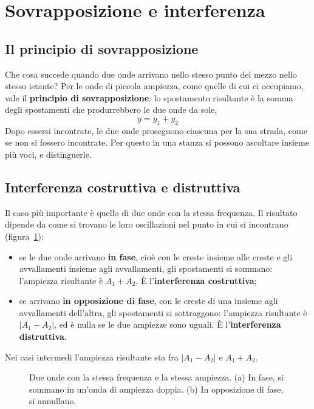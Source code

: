 \section{Sovrapposizione e interferenza}
\label{sec:ud4-interferenza}

\subsection{Il principio di sovrapposizione}

Che cosa succede quando due onde arrivano nello stesso punto del mezzo nello stesso istante? Per le onde di piccola ampiezza, come quelle di cui ci occupiamo, vale il \textbf{principio di sovrapposizione}: lo spostamento risultante è la somma degli spostamenti che produrrebbero le due onde da sole,
\[
  y = y_1 + y_2
\]
Dopo essersi incontrate, le due onde proseguono ciascuna per la sua strada, come se non si fossero incontrate. Per questo in una stanza si possono ascoltare insieme più voci, e distinguerle.

\subsection{Interferenza costruttiva e distruttiva}

Il caso più importante è quello di due onde con la stessa frequenza. Il risultato dipende da come si trovano le loro oscillazioni nel punto in cui si incontrano (figura~\ref{fig:ud4-interferenza}):
\begin{itemize}
  \item se le due onde arrivano \textbf{in fase}, cioè con le creste insieme alle creste e gli avvallamenti insieme agli avvallamenti, gli spostamenti si sommano: l'ampiezza risultante è $A_1 + A_2$. È l'\textbf{interferenza costruttiva};
  \item se arrivano \textbf{in opposizione di fase}, con le creste di una insieme agli avvallamenti dell'altra, gli spostamenti si sottraggono: l'ampiezza risultante è $|A_1 - A_2|$, ed è nulla se le due ampiezze sono uguali. È l'\textbf{interferenza distruttiva}.
\end{itemize}
Nei casi intermedi l'ampiezza risultante sta fra $|A_1 - A_2|$ e $A_1 + A_2$.

\begin{figure}[h]
\centering

\caption{Due onde con la stessa frequenza e la stessa ampiezza. (a) In fase, si sommano in un'onda di ampiezza doppia. (b) In opposizione di fase, si annullano.}
\label{fig:ud4-interferenza}
\end{figure}

